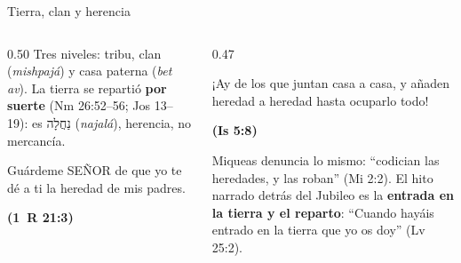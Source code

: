\documentclass[hyperref={bookmarks=false},aspectratio=169]{beamer}
\newcommand{\heb}[1]{\mbox{\foreignlanguage{hebrew}{#1}}}
\newcommand{\SENOR}{S{\fontsize{0.78em}{1em}\selectfont EÑOR}}
\newcommand{\fuente}[1]{\par\hfill{\upshape\bfseries\footnotesize\textcolor{tierraroja}{#1}}}
\newcommand{\destacar}[1]{\textbf{\textcolor{tierraroja}{#1}}}
\begin{document}
\begin{frame}{Tierra, clan y herencia}
\begin{columns}[c,onlytextwidth]
\begin{column}{0.50\textwidth}
\small\RaggedRight Tres niveles: tribu, clan (\emph{mishpajá}) y casa paterna (\emph{bet av}). La tierra se repartió \destacar{por suerte} (Nm 26:52--56; Jos 13--19): es \heb{נַחֲלָה} (\emph{najalá}), herencia, no mercancía.\par\medskip
\begin{cita}Guárdeme \SENOR{} de que yo te dé a ti la heredad de mis padres.\fuente{(1~R 21:3)}\end{cita}
\end{column}
\begin{column}{0.47\textwidth}
\begin{cita}¡Ay de los que juntan casa a casa, y añaden heredad a heredad hasta ocuparlo todo!\fuente{(Is 5:8)}\end{cita}
\scriptsize\RaggedRight Miqueas denuncia lo mismo: ``codician las heredades, y las roban'' (Mi 2:2). El hito narrado detrás del Jubileo es la \destacar{entrada en la tierra y el reparto}: ``Cuando hayáis entrado en la tierra que yo os doy'' (Lv 25:2).
\end{column}
\end{columns}
\end{frame}
\end{document}
